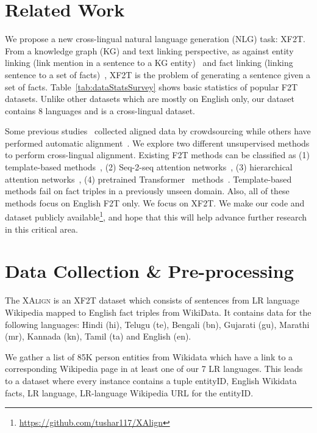 \documentclass[11pt]{article}
\def\langCount{8}
\def\lrLangCount{7}
\begin{document}
\section{Related Work}
\label{sec:related}

We propose a new cross-lingual natural language generation (NLG) task: XF2T. From a knowledge graph (KG) and text linking perspective, as against entity linking (link mention in a sentence to a KG entity)~\cite{botha2020entity} and fact linking (linking sentence to a set of facts)~\cite{kolluru2021multilingual}, XF2T is the problem of generating a sentence given a set of facts. Table~\ref{tab:dataStatsSurvey} shows basic statistics of popular F2T datasets. Unlike other datasets which are mostly on English only, our dataset contains \langCount{} languages and is a cross-lingual dataset. 

Some previous studies~\cite{gardent2017webnlg} collected aligned data by crowdsourcing while others have performed automatic alignment~\cite{agarwal2021knowledge}. We explore two different unsupervised methods to perform cross-lingual alignment. Existing F2T methods can be classified as (1) template-based  methods~\cite{cimiano2013exploiting,duma2013generating}, (2) Seq-2-seq attention networks~\cite{lebret2016wikibio,mei2016talk,shahidi2020two}, (3) hierarchical attention networks~\cite{nema2018generating,chen2020kgpt}, (4) pretrained Transformer~\cite{vaswani2017attention} methods~\cite{ribeiro2021investigating,zhao2020bridging,chen2020kgpt,fu2020partially}. Template-based methods fail on fact triples in a previously unseen domain. Also, all of these methods focus on English F2T only. We focus on XF2T. We make our code and dataset publicly available\footnote{\url{https://github.com/tushar117/XAlign}\label{datafootnote}}, and hope that this will help advance further research in this critical area.



\section{Data Collection \& Pre-processing}
\label{sec:cross_creation}
The \textsc{XAlign} is an XF2T dataset which consists of sentences from LR language Wikipedia mapped to English fact triples from WikiData. It contains data for the following languages: Hindi (hi), Telugu (te), Bengali (bn), Gujarati (gu), Marathi (mr), Kannada (kn), Tamil (ta) and English (en). 




We gather a list of 85K person entities from Wikidata which have a link to a corresponding Wikipedia page in at least one of our \lrLangCount{} LR languages. This leads to a dataset  where every instance  contains a tuple entityID, English Wikidata facts, LR language, LR-language Wikipedia URL for the entityID.
\end{document}
